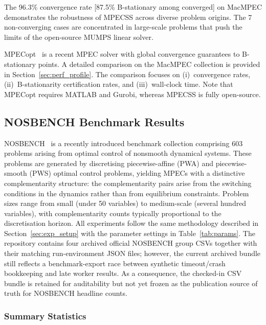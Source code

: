 The 96.3\% convergence rate [87.5\% B-stationary among converged] on MacMPEC demonstrates the robustness of MPECSS across diverse problem origins.  The 7 non-converging cases
are concentrated in large-scale problems that push the limits of the open-source
MUMPS linear solver.

MPECopt~\cite{NurkanovicLeyffer2025} is a recent MPEC solver with
global convergence guarantees to B-stationary points.  A detailed
comparison on the MacMPEC collection is provided in Section~\ref{sec:perf_profile}.
The comparison focuses on (i)~convergence rates, (ii)~B-stationarity
certification rates, and (iii)~wall-clock time.  Note that MPECopt
requires MATLAB and Gurobi, whereas MPECSS is fully open-source.


\subsection{NOSBENCH Benchmark Results}
\label{sec:nosbench}

NOSBENCH~\cite{NurkanovicPozharskiyDiehl2024} is a recently introduced
benchmark collection comprising 603 problems arising from optimal
control of nonsmooth dynamical systems.  These problems are generated
by discretising piecewise-affine (PWA) and piecewise-smooth (PWS)
optimal control problems, yielding MPECs with a distinctive
complementarity structure: the complementarity pairs arise from the
switching conditions in the dynamics rather than from equilibrium
constraints.  Problem sizes range from small (under 50 variables) to
medium-scale (several hundred variables), with complementarity counts
typically proportional to the discretisation horizon.  All experiments
follow the same methodology described in Section~\ref{sec:exp_setup}
with the parameter settings in Table~\ref{tab:params}.  The repository
contains four archived official NOSBENCH group CSVs together with their
matching run-environment JSON files; however, the current archived bundle
still reflects a benchmark-export race between synthetic timeout/crash
bookkeeping and late worker results.  As a consequence, the checked-in
CSV bundle is retained for auditability but not yet frozen as the
publication source of truth for NOSBENCH headline counts.

\subsubsection{Summary Statistics}
\label{sec:nosbench_summary}

